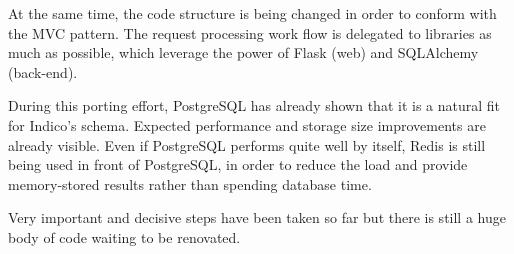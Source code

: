 At the same time, the code structure is being changed in order to conform with the MVC pattern. The request processing work flow is delegated to libraries as much as possible, which leverage the power of Flask (web) and SQLAlchemy (back-end).

During this porting effort, PostgreSQL has already shown that it is a natural fit for Indico's schema. Expected performance and storage size improvements are already visible. Even if PostgreSQL performs quite well by itself, Redis is still being used in front of PostgreSQL, in order to reduce the load and provide memory-stored results rather than spending database time.

Very important and decisive steps have been taken so far but there is still a huge body of code waiting to be renovated.
